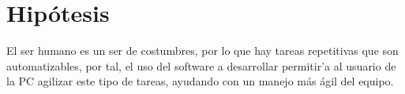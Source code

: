 \section{Hip\'otesis}

El ser humano es un ser de costumbres, por lo que hay tareas repetitivas
 que son automatizables, por tal, el uso del software a desarrollar permitir'a
 al usuario de la PC agilizar este tipo de tareas, ayudando con un manejo más
 \'agil del equipo.
